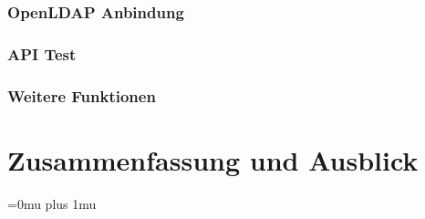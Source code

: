 \documentclass[
book,
a4paper,   
titlepage,  
halfparskip,
12pt        
]{scrartcl}
\begin{document}
\begin{onehalfspacing}
\subsubsection{OpenLDAP Anbindung}

\subsubsection{API Test}

\subsubsection{Weitere Funktionen}


\section{Zusammenfassung und Ausblick}
\label{sec:ausblick}


\newpage
\appendix
\Urlmuskip=0mu plus 1mu



\end{onehalfspacing}
\end{document}
